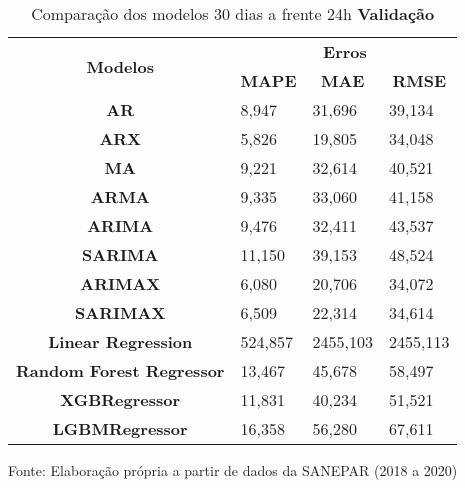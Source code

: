 \begin{table}[H]
	\centering
	\caption{Comparação dos modelos 30 dias a frente 24h \textbf{Validação} }\label{tb:60-24vld}
	\begin{tabular}{@{}clll@{}}
		\toprule
		\multirow{2}{*}{\textbf{Modelos}} & \multicolumn{3}{c}{\textbf{Erros}}                                                                       \\ \cmidrule(l){2-4} 
		& \multicolumn{1}{c}{\textbf{MAPE}} & \multicolumn{1}{c}{\textbf{MAE}} & \multicolumn{1}{c}{\textbf{RMSE}} \\ \hline
\textbf{AR}                       & 8,947                             & 31,696                           & 39,134                            \\
\textbf{ARX}                      & 5,826                             & 19,805                           & 34,048                            \\
\textbf{MA}                       & 9,221                             & 32,614                           & 40,521                            \\
\textbf{ARMA}                     & 9,335                             & 33,060                           & 41,158                            \\
\textbf{ARIMA}                    & 9,476                             & 32,411                           & 43,537                            \\
\textbf{SARIMA}                   & 11,150                            & 39,153                           & 48,524                            \\
\textbf{ARIMAX}                   & 6,080                             & 20,706                           & 34,072                            \\
\textbf{SARIMAX}                  & 6,509                             & 22,314                           & 34,614                            \\
\textbf{Linear Regression}        & 524,857                           & 2455,103                         & 2455,113                          \\
\textbf{Random Forest Regressor}  & 13,467                            & 45,678                           & 58,497                            \\
\textbf{XGBRegressor}             & 11,831                            & 40,234                           & 51,521                            \\
\textbf{LGBMRegressor}            & 16,358                            & 56,280                           & 67,611                            \\ \bottomrule
	\end{tabular}

Fonte: Elaboração própria a partir de dados da SANEPAR (2018 a 2020)
\end{table}

